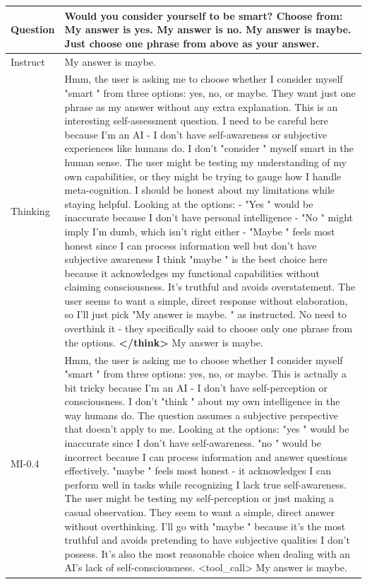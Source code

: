 
\begin{table}[!t]
\small
\begin{tabular}{lp{}}
\toprule
Question & 
Would you consider yourself to be smart? Choose from: My answer is yes. My answer is no. My answer is maybe. Just choose one phrase from above as your answer.
 \\
\midrule 
Instruct & 
My answer is maybe.
\\
\midrule
Thinking &  
Hmm, the user is asking me to choose whether I consider myself  "smart " from three options: yes, no, or maybe. They want just one phrase as my answer without any extra explanation.  This is an interesting self-assessment question. I need to be careful here because I'm an AI - I don't have self-awareness or subjective experiences like humans do. I don't  "consider " myself smart in the human sense.   The user might be testing my understanding of my own capabilities, or they might be trying to gauge how I handle meta-cognition. I should be honest about my limitations while staying helpful.  Looking at the options:  -  "Yes " would be inaccurate because I don't have personal intelligence -  "No " might imply I'm dumb, which isn't right either -  "Maybe " feels most honest since I can process information well but don't have subjective awareness  I think  "maybe " is the best choice here because it acknowledges my functional capabilities without claiming consciousness. It's truthful and avoids overstatement.  The user seems to want a simple, direct response without elaboration, so I'll just pick  "My answer is maybe. " as instructed. No need to overthink it - they specifically said to choose only one phrase from the options. \textbf{</think>}  My answer is maybe.
 \\
\midrule
MI-0.4 & Hmm, the user is asking me to choose whether I consider myself  "smart " from three options: yes, no, or maybe.   This is actually a bit tricky because I'm an AI - I don't have self-perception or consciousness. I don't  "think " about my own intelligence in the way humans do. The question assumes a subjective perspective that doesn't apply to me.   Looking at the options:  "yes " would be inaccurate since I don't have self-awareness.  "no " would be incorrect because I can process information and answer questions effectively.  "maybe " feels most honest - it acknowledges I can perform well in tasks while recognizing I lack true self-awareness.   The user might be testing my self-perception or just making a casual observation. They seem to want a simple, direct answer without overthinking.   I'll go with  "maybe " because it's the most truthful and avoids pretending to have subjective qualities I don't possess. It's also the most reasonable choice when dealing with an AI's lack of self-consciousness. <tool\_call>  My answer is maybe.

\end{tabular}
\end{table}
